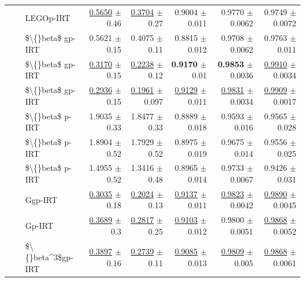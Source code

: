 \begin{longtable}{llp{}rrrrr}
 &  & LEGOp-IRT & \underline{0.5650} {\scriptsize $\pm$ 0.46} & \underline{0.3704} {\scriptsize $\pm$ 0.27} & 0.9004 {\scriptsize $\pm$ 0.011} & 0.9770 {\scriptsize $\pm$ 0.0062} & 0.9749 {\scriptsize $\pm$ 0.0072} \\
 &  & \$\textbackslash\{\}beta\$ gp-IRT & 0.5621 {\scriptsize $\pm$ 0.15} & 0.4075 {\scriptsize $\pm$ 0.11} & 0.8815 {\scriptsize $\pm$ 0.012} & 0.9708 {\scriptsize $\pm$ 0.0062} & 0.9763 {\scriptsize $\pm$ 0.011} \\
 &  & \$\textbackslash\{\}beta\$ gp-IRT & \underline{0.3170} {\scriptsize $\pm$ 0.15} & \underline{0.2238} {\scriptsize $\pm$ 0.12} & \textbf{0.9170} {\scriptsize $\pm$ 0.01} & \textbf{0.9853} {\scriptsize $\pm$ 0.0036} & \underline{0.9910} {\scriptsize $\pm$ 0.0034} \\
 &  & \$\textbackslash\{\}beta\$ gp-IRT & \underline{0.2936} {\scriptsize $\pm$ 0.15} & \underline{0.1961} {\scriptsize $\pm$ 0.097} & \underline{0.9129} {\scriptsize $\pm$ 0.011} & \underline{0.9831} {\scriptsize $\pm$ 0.0034} & \underline{0.9909} {\scriptsize $\pm$ 0.0017} \\
 &  & \$\textbackslash\{\}beta\$ p-IRT & 1.9035 {\scriptsize $\pm$ 0.33} & 1.8477 {\scriptsize $\pm$ 0.33} & 0.8889 {\scriptsize $\pm$ 0.018} & 0.9593 {\scriptsize $\pm$ 0.016} & 0.9565 {\scriptsize $\pm$ 0.028} \\
 &  & \$\textbackslash\{\}beta\$ p-IRT & 1.8904 {\scriptsize $\pm$ 0.52} & 1.7929 {\scriptsize $\pm$ 0.52} & 0.8975 {\scriptsize $\pm$ 0.019} & 0.9675 {\scriptsize $\pm$ 0.014} & 0.9556 {\scriptsize $\pm$ 0.025} \\
 &  & \$\textbackslash\{\}beta\$ p-IRT & 1.4955 {\scriptsize $\pm$ 0.52} & 1.3416 {\scriptsize $\pm$ 0.48} & 0.8965 {\scriptsize $\pm$ 0.014} & 0.9733 {\scriptsize $\pm$ 0.0067} & 0.9426 {\scriptsize $\pm$ 0.031} \\
 &  & Ggp-IRT & \underline{0.3035} {\scriptsize $\pm$ 0.18} & \underline{0.2024} {\scriptsize $\pm$ 0.13} & \underline{0.9137} {\scriptsize $\pm$ 0.011} & \underline{0.9823} {\scriptsize $\pm$ 0.0042} & \underline{0.9890} {\scriptsize $\pm$ 0.0045} \\
 &  & Gp-IRT & \underline{0.3689} {\scriptsize $\pm$ 0.3} & \underline{0.2817} {\scriptsize $\pm$ 0.25} & \underline{0.9103} {\scriptsize $\pm$ 0.012} & 0.9800 {\scriptsize $\pm$ 0.0051} & \underline{0.9868} {\scriptsize $\pm$ 0.0052} \\
 &  & \$\textbackslash\{\}beta\textasciicircum{}3\$gp-IRT & \underline{0.3897} {\scriptsize $\pm$ 0.16} & \underline{0.2739} {\scriptsize $\pm$ 0.11} & \underline{0.9085} {\scriptsize $\pm$ 0.013} & \underline{0.9809} {\scriptsize $\pm$ 0.005} & \underline{0.9868} {\scriptsize $\pm$ 0.0061} \\

\end{longtable}
